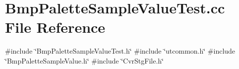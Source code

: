 \section{Bmp\+Palette\+Sample\+Value\+Test.\+cc File Reference}
\label{BmpPaletteSampleValueTest_8cc}
{\ttfamily \#include \char`\"{}Bmp\+Palette\+Sample\+Value\+Test.\+h\char`\"{}}\newline
{\ttfamily \#include \char`\"{}utcommon.\+h\char`\"{}}\newline
{\ttfamily \#include \char`\"{}Bmp\+Palette\+Sample\+Value.\+h\char`\"{}}\newline
{\ttfamily \#include \char`\"{}Cvr\+Stg\+File.\+h\char`\"{}}\newline
